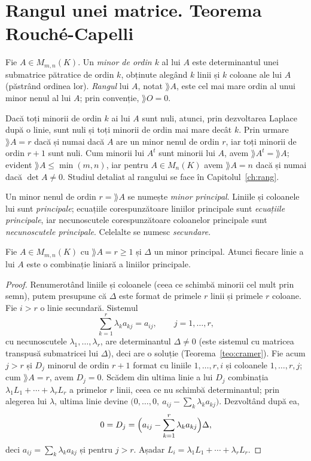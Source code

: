 \section{Rangul unei matrice. Teorema Rouché-Capelli}

\begin{definitie}\label{def:rang}
Fie $A\in M_{m,n}(K)$. Un \emph{minor de ordin $k$} al lui $A$ este determinantul unei submatrice pătratice de ordin $k$, obținute alegând $k$ linii și $k$ coloane ale lui $A$ (păstrând ordinea lor). \emph{Rangul} lui $A$, notat $\rang A$, este cel mai mare ordin al unui minor nenul al lui $A$; prin convenție, $\rang O=0$.
\end{definitie}

\begin{observatie}\label{obs:rangminori}
Dacă toți minorii de ordin $k$ ai lui $A$ sunt nuli, atunci, prin dezvoltarea Laplace după o linie, sunt nuli și toți minorii de ordin mai mare decât $k$. Prin urmare $\rang A=r$ dacă și numai dacă $A$ are un minor nenul de ordin $r$, iar toți minorii de ordin $r+1$ sunt nuli. Cum minorii lui $A^t$ sunt minorii lui $A$, avem $\rang A^t=\rang A$; evident $\rang A\le\min(m,n)$, iar pentru $A\in M_n(K)$ avem $\rang A=n$ dacă și numai dacă $\det A\neq 0$. Studiul detaliat al rangului se face în Capitolul~\ref{ch:rang}.
\end{observatie}

Un minor nenul de ordin $r=\rang A$ se numește \emph{minor principal}. Liniile și coloanele lui sunt \emph{principale}; ecuațiile corespunzătoare liniilor principale sunt \emph{ecuațiile principale}, iar necunoscutele corespunzătoare coloanelor principale sunt \emph{necunoscutele principale}. Celelalte se numesc \emph{secundare}.

\begin{lema}\label{lema:liniisecundare}
Fie $A\in M_{m,n}(K)$ cu $\rang A=r\ge1$ și $\Delta$ un minor principal. Atunci fiecare linie a lui $A$ este o combinație liniară a liniilor principale.
\end{lema}

\begin{proof}
Renumerotând liniile și coloanele (ceea ce schimbă minorii cel mult prin semn), putem presupune că $\Delta$ este format de primele $r$ linii și primele $r$ coloane. Fie $i>r$ o linie secundară. Sistemul
\[
\sum_{k=1}^r\lambda_k a_{kj}=a_{ij},\qquad j=1,\dots,r,
\]
cu necunoscutele $\lambda_1,\dots,\lambda_r$, are determinantul $\Delta\neq0$ (este sistemul cu matricea transpusă submatricei lui $\Delta$), deci are o soluție (Teorema~\ref{teo:cramer}). Fie acum $j>r$ și $D_j$ minorul de ordin $r+1$ format cu liniile $1,\dots,r,i$ și coloanele $1,\dots,r,j$; cum $\rang A=r$, avem $D_j=0$. Scădem din ultima linie a lui $D_j$ combinația $\lambda_1L_1+\cdots+\lambda_rL_r$ a primelor $r$ linii, ceea ce nu schimbă determinantul; prin alegerea lui $\lambda$, ultima linie devine $\bigl(0,\dots,0,\ a_{ij}-\sum_k\lambda_ka_{kj}\bigr)$. Dezvoltând după ea,
\[
0=D_j=\Bigl(a_{ij}-\sum_{k=1}^r\lambda_ka_{kj}\Bigr)\Delta,
\]
deci $a_{ij}=\sum_k\lambda_ka_{kj}$ și pentru $j>r$. Așadar $L_i=\lambda_1L_1+\cdots+\lambda_rL_r$.
\end{proof}

